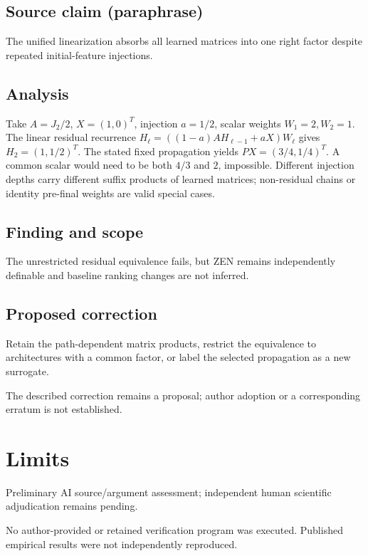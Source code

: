 \documentclass[11pt]{article}
\begin{document}
\subsection*{Source claim (paraphrase)}

The unified linearization absorbs all learned matrices into one right factor despite repeated initial-feature injections.

\subsection*{Analysis}

Take \(A=J_2/2\), \(X=(1,0)^T\), injection \(a=1/2\), scalar weights \(W_1=2,W_2=1\). The linear residual recurrence \(H_\ell=((1-a)AH_{\ell-1}+aX)W_\ell\) gives \(H_2=(1,1/2)^T\). The stated fixed propagation yields \(PX=(3/4,1/4)^T\). A common scalar would need to be both \(4/3\) and \(2\), impossible. Different injection depths carry different suffix products of learned matrices; non-residual chains or identity pre-final weights are valid special cases.

\subsection*{Finding and scope}

The unrestricted residual equivalence fails, but ZEN remains independently definable and baseline ranking changes are not inferred.

\subsection*{Proposed correction}

Retain the path-dependent matrix products, restrict the equivalence to architectures with a common factor, or label the selected propagation as a new surrogate.

The described correction remains a proposal; author adoption or a corresponding erratum is not established.

\section*{Limits}

Preliminary AI source/argument assessment; independent human scientific adjudication remains pending.\par

No author-provided or retained verification program was executed. Published empirical results were not independently reproduced.\par
\end{document}
